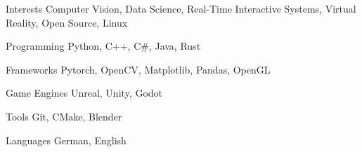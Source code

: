 

\begin{cvskills}

  \cvskill
    {Interests} %
    {Computer Vision, Data Science, Real-Time Interactive Systems, Virtual Reality, Open Source, Linux} %

  \cvskill
    {Programming} %
    {Python, C++, C\#, Java, Rust} %

  \cvskill
    {Frameworks} %
    {Pytorch, OpenCV, Matplotlib, Pandas, OpenGL} %

  \cvskill
    {Game Engines} %
    {Unreal, Unity, Godot} %

  \cvskill
    {Tools} %
    {Git, CMake, Blender} %

  \cvskill
    {Languages} %
    {German, English} %

\end{cvskills}
